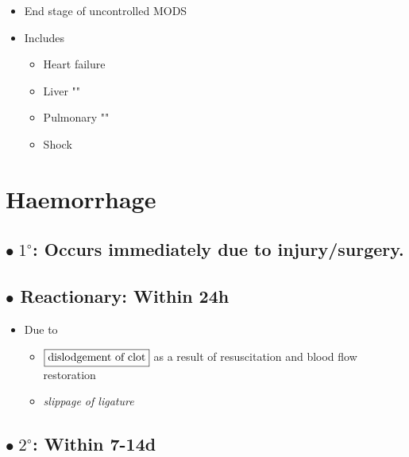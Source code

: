 \documentclass[
  14pt,
]{memoir}
\providecommand{\tightlist}{%
  \setlength{\itemsep}{0pt}\setlength{\parskip}{0pt}}
\begin{document}
\begin{itemize}
\tightlist
\item
  End stage of uncontrolled MODS
\item
  Includes

  \begin{itemize}
  \tightlist
  \item
    Heart failure
  \item
    Liver ""
  \item
    Pulmonary ""
  \item
    Shock
  \end{itemize}
\end{itemize}

\hypertarget{haemorrhage}{%
\section{Haemorrhage}\label{haemorrhage}}

\hypertarget{bullet-1circ-occurs-immediately-due-to-injurysurgery.}{%
\subsection{\texorpdfstring{\(\bullet\; 1^\circ\): Occurs immediately
due to
injury/surgery.}{\textbackslash bullet\textbackslash; 1\^{}\textbackslash circ: Occurs immediately due to injury/surgery.}}\label{bullet-1circ-occurs-immediately-due-to-injurysurgery.}}

\hypertarget{bullet-reactionary-within-24h}{%
\subsection{\texorpdfstring{\(\bullet\) Reactionary: Within
24h}{\textbackslash bullet Reactionary: Within 24h}}\label{bullet-reactionary-within-24h}}

\begin{itemize}
\tightlist
\item
  Due to

  \begin{itemize}
  \tightlist
  \item
    \(\fbox{dislodgement of clot}\) as a result of resuscitation and
    blood flow restoration
  \item
    \emph{slippage of ligature}
  \end{itemize}
\end{itemize}

\hypertarget{bullet-2circ-within-7-14d}{%
\subsection{\texorpdfstring{\(\bullet\; 2^\circ\): Within
7-14d}{\textbackslash bullet\textbackslash; 2\^{}\textbackslash circ: Within 7-14d}}\label{bullet-2circ-within-7-14d}}
\end{document}
